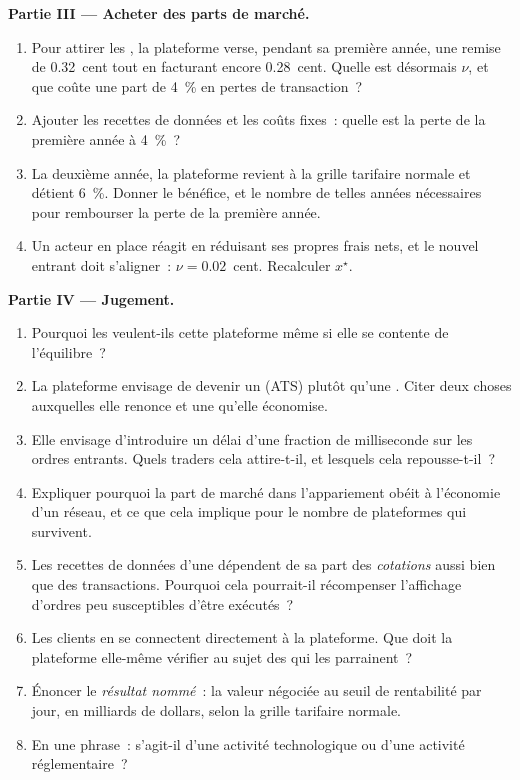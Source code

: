 \begin{problem}
\medskip\noindent\textbf{Partie III --- Acheter des parts de marché.}
\begin{enumerate}[resume]
\item Pour attirer les , la plateforme verse, pendant sa première année, une remise
de 0.32~cent tout en facturant encore 0.28~cent. Quelle est désormais $\nu$, et que coûte
une part de 4~\% en pertes de transaction~?
\item Ajouter les recettes de données et les coûts fixes~: quelle est la perte de la première année à 4~\%~?
\item La deuxième année, la plateforme revient à la grille tarifaire normale et détient 6~\%. Donner le
bénéfice, et le nombre de telles années nécessaires pour rembourser la perte de la première année.
\item Un acteur en place réagit en réduisant ses propres frais nets, et le nouvel entrant doit
s'aligner~: $\nu = 0.02$~cent. Recalculer $x^\star$.
\end{enumerate}

\medskip\noindent\textbf{Partie IV --- Jugement.}
\begin{enumerate}[resume]
\item Pourquoi les  veulent-ils cette plateforme même si elle se contente de l'équilibre~?
\item La plateforme envisage de devenir un  (ATS) plutôt qu'une . Citer deux
choses auxquelles elle renonce et une qu'elle économise.
\item Elle envisage d'introduire un délai d'une fraction de milliseconde sur les ordres entrants.
Quels traders cela attire-t-il, et lesquels cela repousse-t-il~?
\item Expliquer pourquoi la part de marché dans l'appariement obéit à l'économie d'un réseau,
et ce que cela implique pour le nombre de plateformes qui survivent.
\item Les recettes de données d'une  dépendent de sa part des \emph{cotations} aussi
bien que des transactions. Pourquoi cela pourrait-il récompenser l'affichage d'ordres
peu susceptibles d'être exécutés~?
\item Les clients en  se connectent directement à la plateforme. Que doit
la plateforme elle-même vérifier au sujet des  qui les parrainent~?
\item Énoncer le \emph{résultat nommé}~: la valeur négociée au seuil de rentabilité par jour, en
milliards de dollars, selon la grille tarifaire normale.
\item En une phrase~: s'agit-il d'une activité technologique ou d'une activité réglementaire~?
\end{enumerate}
\end{problem}

